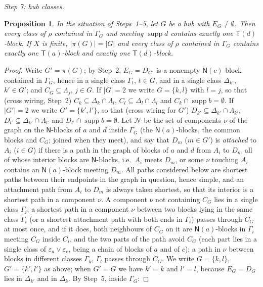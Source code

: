 \documentclass[11pt]{amsart}
\newtheorem{proposition}[theorem]{Proposition}
\theoremstyle{definition}
\newcommand{\supp}{\operatorname{supp}}
\newcommand{\T}{\mathsf{T}}
\newcommand{\N}{\mathsf{N}}
\begin{document}
\smallskip
\emph{Step 7: hub classes.}

\begin{proposition}\label{prop:Qh}
In the situation of Steps~\textup{1--5}, let $G$ be a hub with $E_G\ne\emptyset$. Then every class of $\rho$ contained in $\Gamma_G$ and meeting $\supp d$ contains exactly one $\T(d)$-block. If $X$ is finite, $|\pi(G)|=|G|$ and every class of $\rho$ contained in $\Gamma_G$ contains exactly one $\T(a)$-block and exactly one $\T(d)$-block.
\end{proposition}

\begin{proof}
Write $G'=\pi(G)$; by Step~2, $E_G=D_{G'}$ is a nonempty $\N(c)$-block contained in $\Gamma_G$, hence in a single class $\Gamma_t$, $t\in G$, and in a single class $\Delta_{k'}$, $k'\in G'$; and $C_G\subseteq\Lambda_j$, $j\in G$. If $|G|=2$ we write $G=\{k,l\}$ with $l=j$, so that (cross wiring, Step~2) $C_k\subseteq\Delta_k\cap\Lambda_l$, $C_l\subseteq\Delta_l\cap\Lambda_l$ and $C_k\cap\supp b=\emptyset$. If $|G'|=2$ we write $G'=\{k',l'\}$, so that (cross wiring for $G'$) $D_{k'}\subseteq\Delta_{k'}\cap\Lambda_{k'}$, $D_{l'}\subseteq\Delta_{k'}\cap\Lambda_{l'}$ and $D_{l'}\cap\supp b=\emptyset$. Let $\mathcal N$ be the set of components $\nu$ of the graph on the $\N$-blocks of $a$ and $d$ inside $\Gamma_G$ (the $\N(a)$-blocks, the common blocks and $C_G$; joined when they meet), and say that $D_m$ ($m\in G'$) is \emph{attached} to $A_i$ ($i\in G$) if there is a path in the graph of blocks of $a$ and $d$ from $A_i$ to $D_m$ all of whose interior blocks are $\N$-blocks, i.e.\ $A_i$ meets $D_m$, or some $\nu$ touching $A_i$ contains an $\N(a)$-block meeting $D_m$. All paths considered below are shortest paths between their endpoints in the graph in question, hence simple, and an attachment path from $A_i$ to $D_m$ is always taken shortest, so that its interior is a shortest path in a component $\nu$. A component $\nu$ not containing $C_G$ lies in a single class $\Gamma_i$; a shortest path in a component $\nu$ between two blocks lying in the same class $\Gamma_i$ (or a shortest attachment path with both ends in $\Gamma_i$) passes through $C_G$ at most once, and if it does, both neighbours of $C_G$ on it are $\N(a)$-blocks in $\Gamma_i$ meeting $C_G$ inside $C_i$, and the two parts of the path avoid $C_G$ (each part lies in a single class of $\varepsilon_a\vee\varepsilon_c$, being a chain of blocks of $a$ and of $c$); a path in $\nu$ between blocks in different classes $\Gamma_k$, $\Gamma_l$ passes through $C_G$. We write $G=\{k,l\}$, $G'=\{k',l'\}$ as above; when $G'=G$ we have $k'=k$ and $l'=l$, because $E_G=D_G$ lies in $\Delta_{k'}$ and in $\Delta_k$. By Step~5, inside $\Gamma_G$:

\end{proof}
\end{document}
